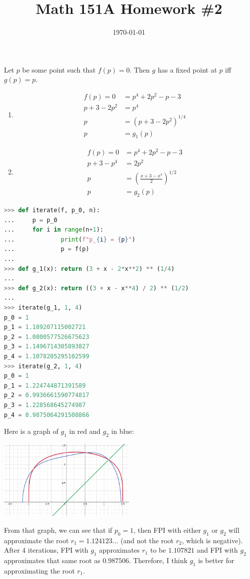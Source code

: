 \documentclass{article}
\date{\today}
\title{Math 151A Homework \#2}
\begin{document}
\maketitle

\bigskip
\begin{prob}
\end{prob}
Let $p$ be some point such that $f(p)=0$. Then $g$ has a fixed point at $p$ iff $g(p)=p$.
\begin{enumerate}[label=(\alph*)]
    \item
        \begin{align*}
            f(p) = 0 &= p^4 + 2p^2 - p - 3 \\
            p + 3 - 2p^2 &= p^4 \\
            p &= \left( p + 3 - 2p^2 \right)^{1/4} \\
            p &= g_1(p)
        \end{align*}
    \item
        \begin{align*}
            f(p) = 0 &= p^4 + 2p^2 - p - 3 \\
            p + 3 - p^4 &= 2p^2 \\
            p &= \left( \frac{x+3-x^4}{2} \right)^{1/2} \\
            p &= g_2(p)
        \end{align*}
\end{enumerate}

\begin{prob}
\end{prob}
\begin{lstlisting}[language=Python]
>>> def iterate(f, p_0, n):
...     p = p_0
...     for i in range(n+1):
...             print(f"p_{i} = {p}")
...             p = f(p)
... 
>>> def g_1(x): return (3 + x - 2*x**2) ** (1/4)
... 
>>> def g_2(x): return ((3 + x - x**4) / 2) ** (1/2)
... 
>>> iterate(g_1, 1, 4)
p_0 = 1
p_1 = 1.189207115002721
p_2 = 1.0800577526675623
p_3 = 1.1496714305893827
p_4 = 1.1078205295102599
>>> iterate(g_2, 1, 4)
p_0 = 1
p_1 = 1.224744871391589
p_2 = 0.9936661590774817
p_3 = 1.228568645274987
p_4 = 0.9875064291508866
\end{lstlisting}
\bigskip
Here is a graph of $g_1$ in red and $g_2$ in blue:
\begin{center}
    \includegraphics[width=0.5\textwidth]{Screenshot from 2024-10-18 19-52-07.png}
\end{center}
From that graph, we can see that if $p_0=1$, then FPI with either $g_1$ or $g_2$ will approximate the root $r_1 = 1.124123\dots$ (and not the root $r_2$, which is negative). After 4 iterations, FPI with $g_1$ approximates $r_1$ to be $1.107821$ and FPI with $g_2$ approximates that same root as $0.987506$. Therefore, I think $g_1$ is better for approximating the root $r_1$.
\end{document}
